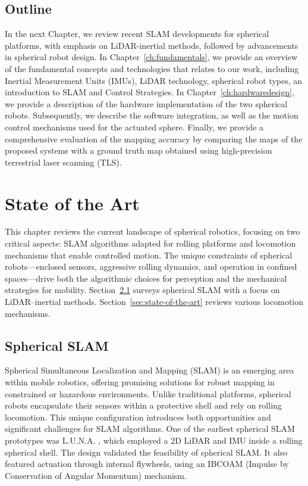 \documentclass[english, bachelor, utf8]{base/thesis_telematics}
\begin{document}
\section{Outline}
In the next Chapter, we review recent SLAM developments for spherical platforms, with emphasis on LiDAR-inertial methods, followed by advancements in spherical robot design.
In Chapter~\ref{ch:fundamentals}, we provide an overview of the fundamental concepts and technologies that relates to our work, including Inertial Measurement Units (IMUs), LiDAR technology, spherical robot types, an introduction to SLAM and Control Strategies.
In Chapter~\ref{ch:hardwaredesign}, we provide a description of the hardware implementation of the two spherical robots. 
Subsequently, we describe the software integration, as well as the motion control mechanisms used for the actuated sphere. 
Finally, we provide a comprehensive evaluation of the mapping accuracy by comparing the maps of the proposed systems with a ground truth map obtained using high-precision terrestrial laser scanning (TLS). 


\chapter{State of the Art}
This chapter reviews the current landscape of spherical robotics, focusing on two critical aspects: SLAM algorithms adapted for rolling platforms and locomotion mechanisms that enable controlled motion. The unique constraints of spherical robots—enclosed sensors, aggressive rolling dynamics, and operation in confined spaces—drive both the algorithmic choices for perception and the mechanical strategies for mobility. Section~\ref{AA} surveys spherical SLAM with a focus on LiDAR–inertial methods. Section~\ref{sec:state-of-the-art} reviews various locomotion mechanisms.

\section{Spherical SLAM}\label{AA}
Spherical Simultaneous Localization and Mapping (SLAM) is an emerging area within mobile robotics, offering promising solutions for robust mapping in constrained or hazardous environments. 
Unlike traditional platforms, spherical robots encapsulate their sensors within a protective shell and rely on rolling locomotion. 
This unique configuration introduces both opportunities and significant challenges for SLAM algorithms. 
One of the earliest spherical SLAM prototypes was L.U.N.A. \cite{luna}, which employed a 2D LiDAR and IMU inside a rolling spherical shell. 
The design validated the feasibility of spherical SLAM. 
It also featured actuation through internal flywheels, using an IBCOAM (Impulse by Conservation of Angular Momentum) mechanism.
\end{document}
